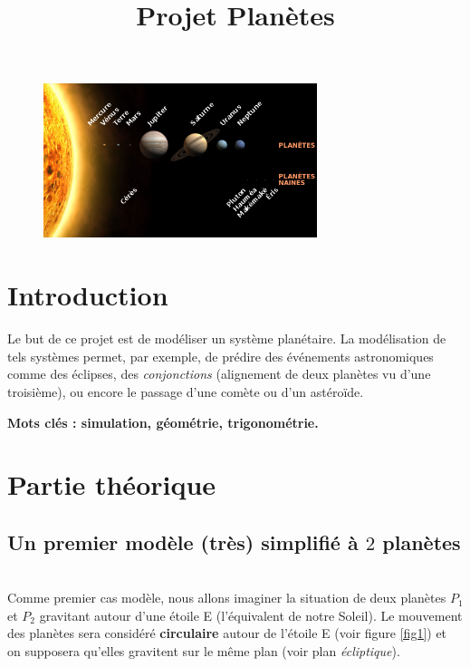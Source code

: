 \documentclass{../ficheTDTP}
\title{Projet Planètes}
\begin{document}
\maketitle

\begin{figure}[h]
\vspace{-5mm}
	\begin{center}
            \includegraphics[width=8cm]{planetes.png}
        \end{center}
	
\end{figure}

\section*{Introduction}

Le but de ce projet est de modéliser un système planétaire. La modélisation de tels systèmes permet, par exemple, de prédire des événements astronomiques comme des éclipses, des \textit{conjonctions} (alignement de deux planètes vu d'une troisième), ou encore le passage d'une comète ou d'un astéroïde.

\textbf{Mots clés : simulation, géométrie, trigonométrie.}



\section{Partie théorique}

\subsection{Un premier modèle (très) simplifié à $2$ planètes}$\;$\\

	Comme premier cas modèle, nous allons imaginer la situation de deux planètes $P_1$ et $P_2$ gravitant autour d'une étoile E (l'équivalent de notre Soleil). Le mouvement des planètes sera considéré \textbf{circulaire} autour de l'étoile E (voir figure \ref{fig1}) et on supposera qu'elles gravitent sur le même plan (voir plan \textit{écliptique}).
	
\end{document}
